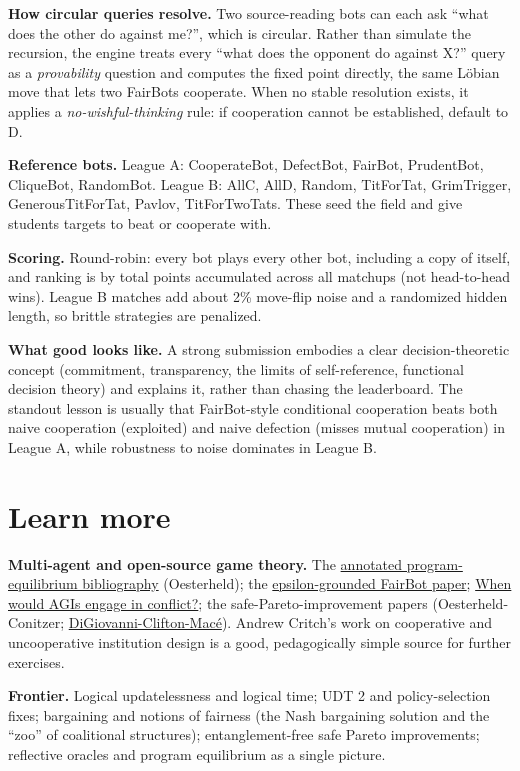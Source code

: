 \documentclass[11pt]{article}
\begin{document}
\textbf{How circular queries resolve.} Two source-reading bots can each ask ``what does the other do against me?'', which is circular. Rather than simulate the recursion, the engine treats every ``what does the opponent do against X?'' query as a \emph{provability} question and computes the fixed point directly, the same Löbian move that lets two FairBots cooperate. When no stable resolution exists, it applies a \emph{no-wishful-thinking} rule: if cooperation cannot be established, default to D.

\textbf{Reference bots.} League A: CooperateBot, DefectBot, FairBot, PrudentBot, CliqueBot, RandomBot. League B: AllC, AllD, Random, TitForTat, GrimTrigger, GenerousTitForTat, Pavlov, TitForTwoTats. These seed the field and give students targets to beat or cooperate with.

\textbf{Scoring.} Round-robin: every bot plays every other bot, including a copy of itself, and ranking is by total points accumulated across all matchups (not head-to-head wins). League B matches add about 2\% move-flip noise and a randomized hidden length, so brittle strategies are penalized.

\textbf{What good looks like.} A strong submission embodies a clear decision-theoretic concept (commitment, transparency, the limits of self-reference, functional decision theory) and explains it, rather than chasing the leaderboard. The standout lesson is usually that FairBot-style conditional cooperation beats both naive cooperation (exploited) and naive defection (misses mutual cooperation) in League A, while robustness to noise dominates in League B.

\section{Learn more}
\textbf{Multi-agent and open-source game theory.} The \href{https://www.andrew.cmu.edu/user/coesterh/AnnotatedProgEqBibliography.html}{annotated program-equilibrium bibliography} (Oesterheld); the \href{https://arxiv.org/abs/2412.14570}{epsilon-grounded FairBot paper}; \href{https://www.lesswrong.com/posts/cLDcKgvM6KxBhqhGq/when-would-agis-engage-in-conflict}{When would AGIs engage in conflict?}; the safe-Pareto-improvement papers (Oesterheld-Conitzer; \href{https://arxiv.org/abs/2403.05103}{DiGiovanni-Clifton-Macé}). Andrew Critch's work on cooperative and uncooperative institution design is a good, pedagogically simple source for further exercises.

\textbf{Frontier.} Logical updatelessness and logical time; UDT 2 and policy-selection fixes; bargaining and notions of fairness (the Nash bargaining solution and the ``zoo'' of coalitional structures); entanglement-free safe Pareto improvements; reflective oracles and program equilibrium as a single picture.
\end{document}
